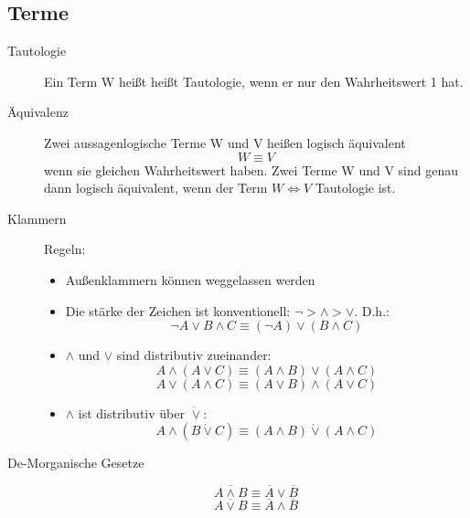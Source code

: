 \subsection{Terme}
\begin{description}
    \item[Tautologie] Ein Term W heißt heißt Tautologie, wenn er nur den Wahrheitswert 1 hat.
    \item[Äquivalenz] Zwei aussagenlogische Terme W und V heißen logisch äquivalent $$W \equiv V$$ wenn sie gleichen Wahrheitswert haben. Zwei Terme W und V sind genau dann logisch äquivalent, wenn der Term $W\Leftrightarrow V$ Tautologie ist.
    \item[Klammern] Regeln:
    \begin{itemize}
        \item Außenklammern können weggelassen werden
        \item Die stärke der Zeichen ist konventionell: $\neg > \wedge > \vee$. D.h.:
        $$\neg A \vee B \wedge C \equiv (\neg A) \vee (B \wedge C)$$
        \item $\wedge$ und $\vee$ sind distributiv zueinander:
        $$A \wedge (A \vee C) \equiv (A \wedge B) \vee (A \wedge C)$$
        $$A \vee (A \wedge C) \equiv (A \vee B) \wedge (A \vee C)$$
        \item $\wedge$ ist distributiv über $\dot{\vee}$:
        $$A \wedge (B \dot{\vee} C) \equiv (A \wedge B) \dot{\vee} (A \wedge C)$$
    \end{itemize}
    \item[De-Morganische Gesetze] $$\overline{A \wedge B} \equiv \overline{A} \vee \overline{B}$$ $$\overline{A \vee B} \equiv \overline{A} \wedge \overline{B}$$
\end{description}

